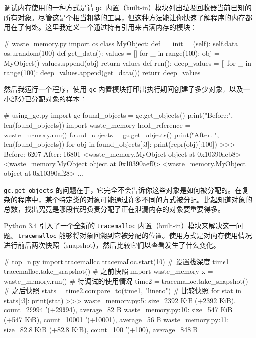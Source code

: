 调试内存使用的一种方式是请 \texttt{gc} 内置（built-in）模块列出垃圾回收器当前已知的所有对象。尽管这是个相当粗糙的工具，但这种方法能让你快速了解程序的内存都用在了何处。这里我定义一个通过持有引用来占满内存的模块：

\begin{codebox}[python]
# waste_memory.py
import os
class MyObject:
    def __init__(self):
        self.data = os.urandom(100)
def get_data():
    values = []
    for _ in range(100):
        obj = MyObject()
        values.append(obj)
    return values
def run():
    deep_values = []
    for _ in range(100):
        deep_values.append(get_data())
    return deep_values
\end{codebox}

然后我运行一个程序，使用 \texttt{gc} 内置模块打印出执行期间创建了多少对象，以及一小部分已分配对象的样本：

\begin{codebox}[python]
# using_gc.py
import gc
found_objects = gc.get_objects()
print("Before:", len(found_objects))
import waste_memory
hold_reference = waste_memory.run()
found_objects = gc.get_objects()
print("After: ", len(found_objects))
for obj in found_objects[:3]:
    print(repr(obj)[:100])
>>>
Before: 6207
After:  16801
<waste_memory.MyObject object at 0x10390aeb8>
<waste_memory.MyObject object at 0x10390aef0>
<waste_memory.MyObject object at 0x10390af28>
...
\end{codebox}

\texttt{gc.get\_objects} 的问题在于，它完全不会告诉你这些对象是如何被分配的。在复杂的程序中，某个特定类的对象可能通过许多不同的方式被分配。比起知道对象的总数，找出究竟是哪段代码负责分配了正在泄漏内存的对象要重要得多。

Python 3.4 引入了一个全新的 \texttt{tracemalloc} 内置（built-in）模块来解决这一问题。\texttt{tracemalloc} 能够将对象回溯到它被分配的位置。使用方式是对内存使用情况进行前后两次快照（snapshot），然后比较它们以查看发生了什么变化。

\begin{codebox}[python]
# top_n.py
import tracemalloc
tracemalloc.start(10)                      # 设置栈深度
time1 = tracemalloc.take_snapshot()        # 之前快照
import waste_memory
x = waste_memory.run()                     # 待调试的使用情况
time2 = tracemalloc.take_snapshot()        # 之后快照
stats = time2.compare_to(time1, "lineno")  # 比较快照
for stat in stats[:3]:
    print(stat)
>>>
waste_memory.py:5: size=2392 KiB (+2392 KiB), count=29994
'(+29994), average=82 B
waste_memory.py:10: size=547 KiB (+547 KiB), count=10001
'(+10001), average=56 B
waste_memory.py:11: size=82.8 KiB (+82.8 KiB), count=100
'(+100), average=848 B
\end{codebox}

